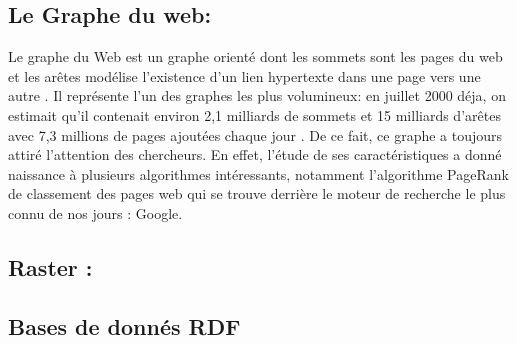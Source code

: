 		\subsection{Le Graphe du web:}
		 Le graphe du Web est un graphe orienté dont les sommets sont les pages du web et les arêtes modélise l'existence d'un lien hypertexte dans une page vers une autre \citep{brisaboa2009k}. Il représente l'un des graphes les plus volumineux: en juillet 2000 déja, on estimait qu’il contenait environ 2,1 milliards de sommets et 15 milliards d’arêtes avec 7,3 millions de pages ajoutées chaque jour \citep{guillaume2002web}. De ce fait, ce graphe a toujours attiré l'attention des chercheurs. En effet, l'étude de ses caractéristiques a donné naissance à plusieurs algorithmes intéressants, notamment l'algorithme PageRank de classement des pages web qui se trouve derrière le moteur de recherche le plus connu de nos jours : Google.
		 
		 
		 \subsection{Raster :}
		 
		
		 
		 
		 \subsection{Bases de donnés RDF}